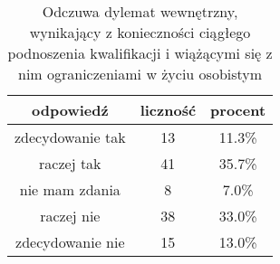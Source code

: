 \begin{table}[H]
\caption{Odczuwa dylemat wewnętrzny, wynikający z konieczności ciągłego podnoszenia kwalifikacji i wiążącymi się z nim ograniczeniami w życiu osobistym}
\centering
\begin{tabular}{ | c | c | c |}
\hline
odpowiedź & liczność & procent\\
\hline
zdecydowanie tak  &  13  & 11.3\% \\
\hline
raczej tak  &  41  & 35.7\% \\
\hline
nie mam zdania  &  8  & 7.0\% \\
\hline
raczej nie  &  38  & 33.0\% \\
\hline
zdecydowanie nie  &  15  & 13.0\% \\
\hline
\end{tabular}
\label{tab:Q14}
\end{table}
